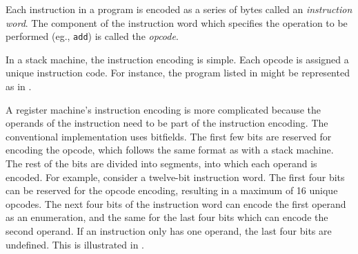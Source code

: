 			Each instruction in a program is encoded as a series of bytes called an \emph{instruction word}. The component of the instruction word which specifies the operation to be performed (eg., \texttt{add}) is called the \emph{opcode}. 
			
			In a stack machine, the instruction encoding is simple. Each opcode is assigned a unique instruction code. For instance, the program listed in  might be represented as in .
			
			A register machine's instruction encoding is more complicated because the operands of the instruction need to be part of the instruction encoding. The conventional implementation uses bitfields. The first few bits are reserved for encoding the opcode, which follows the same format as with a stack machine. The rest of the bits are divided into segments, into which each operand is encoded. For example, consider a twelve-bit instruction word. The first four bits can be reserved for the opcode encoding, resulting in a maximum of 16 unique opcodes. The next four bits of the instruction word can encode the first operand as an enumeration, and the same for the last four bits which can encode the second operand. If an instruction only has one operand, the last four bits are undefined. This is illustrated in .
			
			\begin{doublefig}
			\end{doublefig}
			
